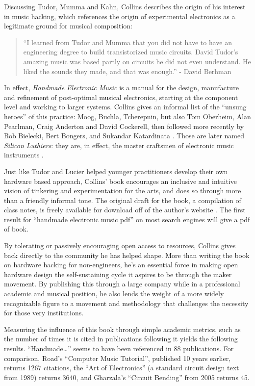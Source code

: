 Discussing Tudor, Mumma and Kahn, Collins describes the origin of his interest in music hacking, which references the origin of experimental electronics as a legitimate ground for musical composition: 

\begin{quote}
“I learned from Tudor and Mumma that you did not have to have an engineering degree to build transistorized music circuits. David Tudor’s amazing music was based partly on circuits he did not even understand. He liked the sounds they made, and that was enough.” 
- David Berhman \cite[p.ix]{collins2006}  
\end{quote}

In effect, \textit{Handmade Electronic Music} is a manual for the design, manufacture and refinement of post-optimal musical electronics, starting at the component level and working to larger systems. Collins gives an informal list of the ``unsung heroes'' of this practice: Moog, Buchla, Tcherepnin, but also Tom Oberheim, Alan Pearlman, Craig Anderton and David Cockerell, then followed more recently by Bob Bielecki, Bert Bongers, and Sukandar Katardinata \citep[p.211]{collins2006}. Those are later named  \textit{Silicon Luthiers}: they are, in effect, the master craftsmen of electronic music instruments \citep{collins2008}.

Just like Tudor and Lucier helped younger practitioners develop their own hardware based approach, Collins' book encourages an inclusive and intuitive vision of tinkering and experimentation for the arts, and does so through more than a friendly informal tone. The original draft for the book, a compilation of class notes, is freely available for download off of the author’s website \citep{collins} . The first result for “handmade electronic music pdf” on most search engines will give a pdf of book.

By tolerating or passively encouraging open access to resources, Collins gives back directly to the community he has helped shape. More than writing the book on hardware hacking for non-engineers, he’s an essential force in making open hardware design the self-sustaining cycle it aspires to be through the maker movement. By publishing this through a large company while in a professional academic and musical position, he also lends the weight of a more widely recognizable figure to a movement and methodology that challenges the necessity for those very institutions.

Measuring the influence of this book through simple academic metrics, such as the number of times it is cited in publications following it \citep{harzing2008} yields the following results. “Handmade…” seems to have been referenced in 88 publications. For comparison, Road’s “Computer Music Tutorial”, published 10 years earlier, returns 1267 citations, the “Art of Electronics” (a standard circuit design text from 1989) returns 3640, and Gharzala’s “Circuit Bending” from 2005 returns 45. 

